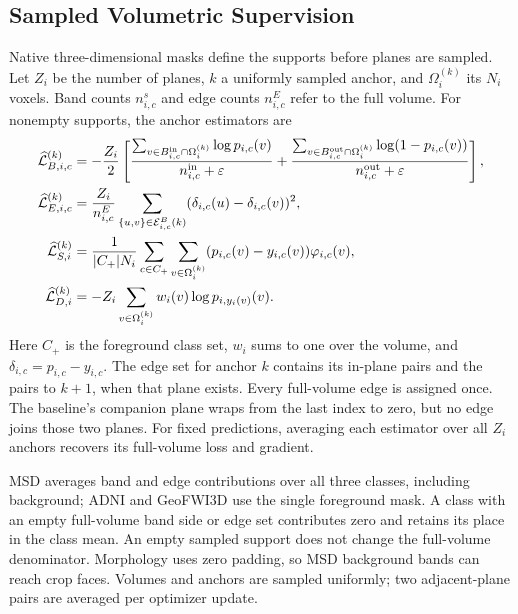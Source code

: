 \subsection{Sampled Volumetric Supervision}
\label{sec:sampled-pretrained-supervision}

Native three-dimensional masks define the supports before planes are
sampled. Let $Z_i$ be the number of planes, $k$ a uniformly sampled
anchor, and $\Omega_i^{(k)}$ its $N_i$ voxels. Band counts $n_{i,c}^s$
and edge counts $n_{i,c}^E$ refer to the full volume. For nonempty
supports, the anchor estimators are
\begin{align}
\widehat{\mathcal L}_{B,i,c}^{(k)}
 &=-\frac{Z_i}{2}\left[
 \frac{\sum_{v\in B_{i,c}^{\rm in}\cap\Omega_i^{(k)}}\log p_{i,c}(v)}{n_{i,c}^{\rm in}+\varepsilon}
 +\frac{\sum_{v\in B_{i,c}^{\rm out}\cap\Omega_i^{(k)}}\log(1-p_{i,c}(v))}{n_{i,c}^{\rm out}+\varepsilon}
 \right],\label{eq:medsam-sampled-band-loss}\\
\widehat{\mathcal L}_{E,i,c}^{(k)}
 &=\frac{Z_i}{n_{i,c}^E}\sum_{\{u,v\}\in\mathcal E_{i,c}^B(k)}
 (\delta_{i,c}(u)-\delta_{i,c}(v))^2,\label{eq:medsam-sampled-edge-loss}\\
\widehat{\mathcal L}_{S,i}^{(k)}
 &=\frac{1}{|C_+|N_i}\sum_{c\in C_+}\sum_{v\in\Omega_i^{(k)}}
 (p_{i,c}(v)-y_{i,c}(v))\varphi_{i,c}(v),\label{eq:medsam-sampled-sdf}\\
\widehat{\mathcal L}_{D,i}^{(k)}
 &=-Z_i\sum_{v\in\Omega_i^{(k)}}w_i(v)\log p_{i,y_i(v)}(v).
 \label{eq:medsam-sampled-depth}
\end{align}
Here $C_+$ is the foreground class set, $w_i$ sums to one over the
volume, and $\delta_{i,c}=p_{i,c}-y_{i,c}$. The edge set for anchor $k$
contains its in-plane pairs and the pairs to $k+1$, when that plane
exists. Every full-volume edge is assigned once. The baseline's
companion plane wraps from the last index to zero, but no edge joins
those two planes. For fixed predictions, averaging each estimator over
all $Z_i$ anchors recovers its full-volume loss and gradient.

MSD averages band and edge contributions over all three classes,
including background; ADNI and GeoFWI3D use the single foreground
mask. A class with an empty full-volume band side or edge set contributes
zero and retains its place in the class mean. An empty sampled support
does not change the full-volume denominator. Morphology uses zero
padding, so MSD background bands can reach crop faces. Volumes and
anchors are sampled uniformly; two adjacent-plane pairs are averaged
per optimizer update.

